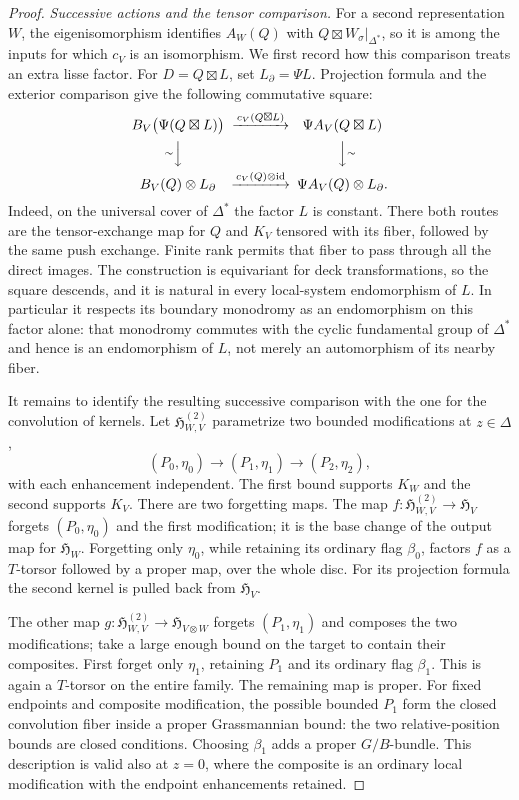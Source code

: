 \begin{proof}
\smallskip\noindent
\emph{Successive actions and the tensor comparison.}
For a second representation $W$, the eigenisomorphism identifies
$A_W(Q)$ with $Q\boxtimes W_\sigma|_{\Delta^*}$, so it is among the
inputs for which $c_V$ is an isomorphism.  We first record how this
comparison treats an extra lisse factor.  For $D=Q\boxtimes L$, set
$L_\partial=\Psi L$.  Projection formula
and the exterior comparison give the following commutative square:
\begin{equation}\label{eq:descent-lisse-square}
\begin{CD}
 B_V\bigl(\Psi(Q\boxtimes L)\bigr)
   @>{c_V(Q\boxtimes L)}>> \Psi A_V(Q\boxtimes L)\\
 @V{\sim}VV @VV{\sim}V\\
 B_V(Q)\otimes L_\partial
   @>{c_V(Q)\otimes\mathrm{id}}>>
       \Psi A_V(Q)\otimes L_\partial.
\end{CD}
\end{equation}
Indeed, on the universal cover of $\Delta^*$ the factor $L$ is
constant.  There both routes are the tensor-exchange map for $Q$
and $K_V$ tensored with its fiber, followed by the same push exchange.
Finite rank permits that fiber to pass through all the direct images.
The construction is equivariant for deck transformations, so the
square descends, and it is natural in every local-system endomorphism
of $L$.  In particular it respects its boundary monodromy as an
endomorphism on this factor alone: that monodromy commutes with the
cyclic fundamental group of $\Delta^*$ and hence is an endomorphism
of $L$, not merely an automorphism of its nearby fiber.

It remains to identify the resulting successive comparison with the
one for the convolution of kernels.  Let
$\mathfrak H^{(2)}_{W,V}$ parametrize two bounded modifications at
$z\in\Delta$,
\[
 (P_0,\eta_0)\longrightarrow(P_1,\eta_1)
                  \longrightarrow(P_2,\eta_2),
\]
with each enhancement independent.  The first bound supports $K_W$
and the second supports $K_V$.  There are two forgetting maps.
The map $f:\mathfrak H^{(2)}_{W,V}\to\mathfrak H_V$ forgets
$(P_0,\eta_0)$ and the first modification; it is the base change of
the output map for $\mathfrak H_W$.  Forgetting only $\eta_0$, while
retaining its ordinary flag $\beta_0$, factors $f$ as a $T$-torsor
followed by a proper map, over the whole disc.  For its projection
formula the second kernel is pulled back from $\mathfrak H_V$.

The other map
$g:\mathfrak H^{(2)}_{W,V}\to\mathfrak H_{V\otimes W}$ forgets
$(P_1,\eta_1)$ and composes the two modifications; take a large enough
bound on the target to contain their composites.  First forget only
$\eta_1$, retaining $P_1$ and its ordinary flag $\beta_1$.  This is
again a $T$-torsor on the entire family.  The remaining map is proper.
For fixed endpoints and composite modification, the possible bounded
$P_1$ form the closed convolution fiber inside a proper Grassmannian
bound: the two relative-position bounds are closed conditions.
Choosing $\beta_1$ adds a proper $G/B$-bundle.  This description
is valid also at $z=0$, where the composite is an ordinary local
modification with the endpoint enhancements retained.


\end{proof}
